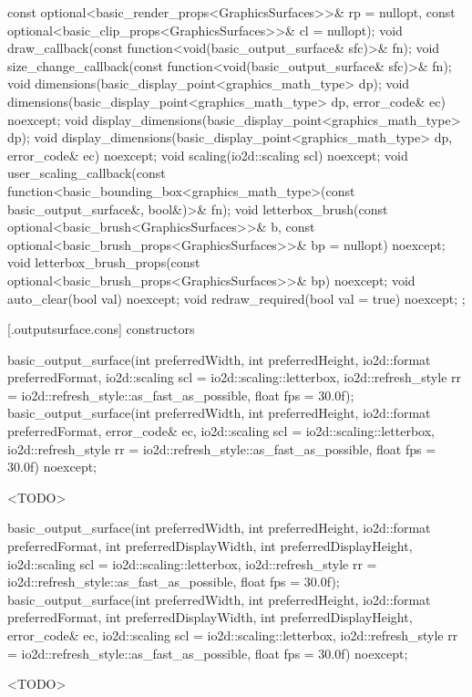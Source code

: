 \begin{codeblock}
{{      const optional<basic_render_props<GraphicsSurfaces>>& rp = nullopt,
      const optional<basic_clip_props<GraphicsSurfaces>>& cl = nullopt);
    void draw_callback(const function<void(basic_output_surface& sfc)>& fn);
    void size_change_callback(const function<void(basic_output_surface& sfc)>& fn);
    void dimensions(basic_display_point<graphics_math_type> dp);
    void dimensions(basic_display_point<graphics_math_type> dp, error_code& ec) noexcept;
    void display_dimensions(basic_display_point<graphics_math_type> dp);
    void display_dimensions(basic_display_point<graphics_math_type> dp, error_code& ec) noexcept;
    void scaling(io2d::scaling scl) noexcept;
    void user_scaling_callback(const
      function<basic_bounding_box<graphics_math_type>(const basic_output_surface&, bool&)>& fn);
    void letterbox_brush(const optional<basic_brush<GraphicsSurfaces>>& b,
      const optional<basic_brush_props<GraphicsSurfaces>>& bp = nullopt) noexcept;
    void letterbox_brush_props(const optional<basic_brush_props<GraphicsSurfaces>>& bp) noexcept;
    void auto_clear(bool val) noexcept;
    void redraw_required(bool val = true) noexcept;
  };
}
\end{codeblock}

 [\iotwod.outputsurface.cons] { constructors}

%
\begin{itemdecl}
basic_output_surface(int preferredWidth, int preferredHeight, io2d::format preferredFormat,
  io2d::scaling scl = io2d::scaling::letterbox,
  io2d::refresh_style rr = io2d::refresh_style::as_fast_as_possible, float fps = 30.0f);
basic_output_surface(int preferredWidth, int preferredHeight, io2d::format preferredFormat,
  error_code& ec, io2d::scaling scl = io2d::scaling::letterbox,
  io2d::refresh_style rr = io2d::refresh_style::as_fast_as_possible, float fps = 30.0f)
  noexcept;
\end{itemdecl}
\begin{itemdescr}
\pnum
<TODO>
\end{itemdescr}

%
\begin{itemdecl}
basic_output_surface(int preferredWidth, int preferredHeight, io2d::format preferredFormat,
  int preferredDisplayWidth, int preferredDisplayHeight,
  io2d::scaling scl = io2d::scaling::letterbox,
  io2d::refresh_style rr = io2d::refresh_style::as_fast_as_possible, float fps = 30.0f);
basic_output_surface(int preferredWidth, int preferredHeight,
  io2d::format preferredFormat, int preferredDisplayWidth, int preferredDisplayHeight,
  error_code& ec, io2d::scaling scl = io2d::scaling::letterbox,
  io2d::refresh_style rr = io2d::refresh_style::as_fast_as_possible, float fps = 30.0f)
  noexcept;
\end{itemdecl}
\begin{itemdescr}
\pnum
<TODO>
\end{itemdescr}

